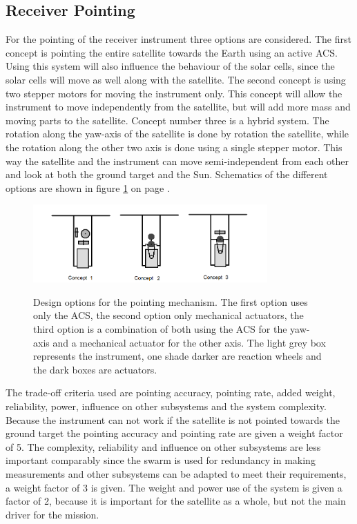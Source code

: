 \subsection{Receiver Pointing}
For the pointing of the receiver instrument three options are considered. The first concept is pointing the entire satellite towards the Earth using an active \ac{ACS}. Using this system will also influence the behaviour of the solar cells, since the solar cells will move as well along with the satellite. The second concept is using two stepper motors for moving the instrument only. This concept will allow the instrument to move independently from the satellite, but will add more mass and moving parts to the satellite. Concept number three is a hybrid system. The rotation along the yaw-axis of the satellite is done by rotation the satellite, while the rotation along the other two axis is done using a single stepper motor. This way the satellite and the instrument can move semi-independent from each other and look at both the ground target and the Sun. Schematics of the different options are shown in figure \ref{fig:pointeroptions} on page \pageref{fig:pointeroptions}.

\begin{figure}[h]
\centering
\includegraphics[width=0.8\textwidth, bb=0 0 895px 298px]{img/pointingsystemoptions.png} 
\label{fig:pointeroptions}
\caption[Design options for the pointing mechanism]{Design options for the pointing mechanism. The first option uses only the \ac{ACS}, the second option only mechanical actuators, the third option is a combination of both using the \ac{ACS} for the yaw-axis and a mechanical actuator for the other axis. The light grey box represents the instrument, one shade darker are reaction wheels and the dark boxes are actuators.}
\end{figure}

The trade-off criteria used are pointing accuracy, pointing rate, added weight, reliability, power, influence on other subsystems and the system complexity. Because the instrument can not work if the satellite is not pointed towards the ground target the pointing accuracy and pointing rate are given a weight factor of 5. The complexity, reliability and influence on other subsystems are less important comparably since the swarm is used for redundancy in making measurements and other subsystems can be adapted to meet their requirements, a weight factor of 3 is given. The weight and power use of the system is given a factor of 2, because it is important for the satellite as a whole, but not the main driver for the mission.

